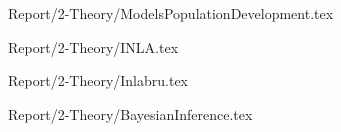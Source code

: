{Report/2-Theory/ModelsPopulationDevelopment.tex}

{Report/2-Theory/INLA.tex}

{Report/2-Theory/Inlabru.tex}

{Report/2-Theory/BayesianInference.tex}
